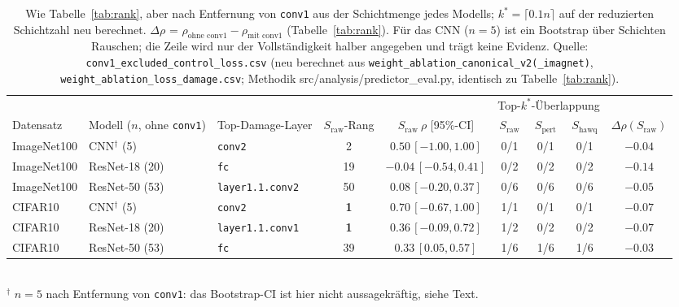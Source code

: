 \begin{table}[t]
\centering
\small
\setlength{\tabcolsep}{3.5pt}
\caption{Wie Tabelle~\ref{tab:rank}, aber nach Entfernung von \texttt{conv1} aus der Schichtmenge jedes Modells; $k^*=\lceil 0.1n\rceil$ auf der reduzierten Schichtzahl neu berechnet. $\Delta\rho$ = $\rho_{\text{ohne conv1}}-\rho_{\text{mit conv1}}$ (Tabelle~\ref{tab:rank}). Für das CNN ($n=5$) ist ein Bootstrap über Schichten Rauschen; die Zeile wird nur der Vollständigkeit halber angegeben und trägt keine Evidenz. Quelle: \texttt{conv1\_excluded\_control\_loss.csv} (neu berechnet aus \texttt{weight\_ablation\_canonical\_v2(\_imagnet)}, \texttt{weight\_ablation\_loss\_damage.csv}; Methodik src/analysis/predictor\_eval.py, identisch zu Tabelle~\ref{tab:rank}).}
\label{tab:rank-noconv1}
\begin{tabularx}{\textwidth}{@{} ll l c c ccc c @{}}
\toprule
& & & & & \multicolumn{3}{c}{Top-$k^*$-Überlappung} & \\
\cmidrule(lr){6-8}
Datensatz & Modell ($n$, ohne \texttt{conv1}) & Top-Damage-Layer & $S_{\mathrm{raw}}$-Rang & $S_{\mathrm{raw}}\ \rho$ [95\%-CI] & $S_{\mathrm{raw}}$ & $S_{\mathrm{pert}}$ & $S_{\mathrm{hawq}}$ & $\Delta\rho(S_{\mathrm{raw}})$ \\
\midrule
ImageNet100 & CNN$^\dagger$ (5)      & \texttt{conv2}          & 2           & $0.50\,[-1.00,1.00]$         & 0/1 & 0/1 & 0/1 & $-0.04$ \\
ImageNet100 & ResNet-18 (20)          & \texttt{fc}             & 19          & $-0.04\,[-0.54,0.41]$        & 0/2 & 0/2 & 0/2 & $-0.14$ \\
ImageNet100 & ResNet-50 (53)          & \texttt{layer1.1.conv2} & 50          & $0.08\,[-0.20,0.37]$         & 0/6 & 0/6 & 0/6 & $-0.05$ \\
CIFAR10     & CNN$^\dagger$ (5)      & \texttt{conv2}          & \textbf{1}  & $0.70\,[-0.67,1.00]$         & 1/1 & 0/1 & 0/1 & $-0.07$ \\
CIFAR10     & ResNet-18 (20)          & \texttt{layer1.1.conv1} & \textbf{1}  & $0.36\,[-0.09,0.72]$         & 1/2 & 0/2 & 0/2 & $-0.07$ \\
CIFAR10     & ResNet-50 (53)          & \texttt{fc}             & 39          & $\mathbf{0.33\,[0.05,0.57]}$ & 1/6 & 1/6 & 1/6 & $-0.03$ \\
\bottomrule
\end{tabularx}
\\[2pt]
{\footnotesize $^\dagger$ $n=5$ nach Entfernung von \texttt{conv1}: das Bootstrap-CI ist hier nicht aussagekräftig, siehe Text.}
\end{table}

